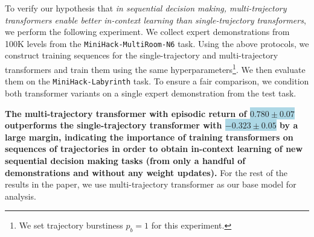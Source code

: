 To verify our hypothesis that \textit{in sequential decision making, multi-trajectory transformers enable better in-context learning than single-trajectory transformers}, we perform the following experiment. We collect expert demonstrations from 100K levels from the \texttt{MiniHack-MultiRoom-N6} task. Using the above protocols, we construct training sequences for the single-trajectory and multi-trajectory transformers and train them using the same hyperparameters\footnote{We set trajectory burstiness $p_b = 1$ for this experiment.}. 
We then evaluate them on the \texttt{MiniHack-Labyrinth} task. To ensure a fair comparison, we condition both transformer variants on a single expert demonstration from the test task. 

\textbf{The multi-trajectory transformer with episodic return of \colorbox{lightblue}{\( 0.780 \pm 0.07 \)}
 outperforms the single-trajectory transformer with \colorbox{lightblue}{\(-0.323 \pm 0.05\)}  by a large margin, indicating the importance of training transformers on sequences of trajectories in order to obtain in-context learning of new sequential decision making tasks (from only a handful of demonstrations and without any weight updates).} For the rest of the results in the paper, we use multi-trajectory transformer as our base model for analysis. 
